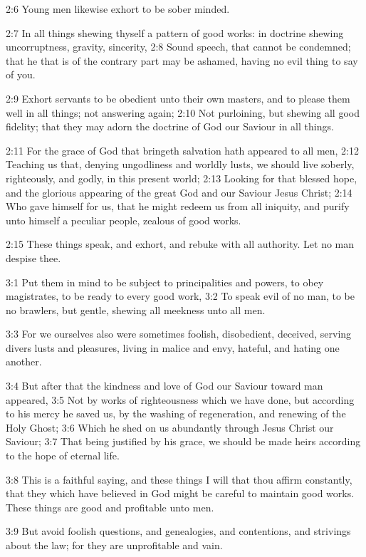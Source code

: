 2:6 Young men likewise exhort to be sober minded.

2:7 In all things shewing thyself a pattern of good works: in doctrine shewing uncorruptness, gravity, sincerity, 2:8 Sound speech, that cannot be condemned; that he that is of the contrary part may be ashamed, having no evil thing to say of you.

2:9 Exhort servants to be obedient unto their own masters, and to please them well in all things; not answering again; 2:10 Not purloining, but shewing all good fidelity; that they may adorn the doctrine of God our Saviour in all things.

2:11 For the grace of God that bringeth salvation hath appeared to all men, 2:12 Teaching us that, denying ungodliness and worldly lusts, we should live soberly, righteously, and godly, in this present world; 2:13 Looking for that blessed hope, and the glorious appearing of the great God and our Saviour Jesus Christ; 2:14 Who gave himself for us, that he might redeem us from all iniquity, and purify unto himself a peculiar people, zealous of good works.

2:15 These things speak, and exhort, and rebuke with all authority.  Let no man despise thee.

3:1 Put them in mind to be subject to principalities and powers, to obey magistrates, to be ready to every good work, 3:2 To speak evil of no man, to be no brawlers, but gentle, shewing all meekness unto all men.

3:3 For we ourselves also were sometimes foolish, disobedient, deceived, serving divers lusts and pleasures, living in malice and envy, hateful, and hating one another.

3:4 But after that the kindness and love of God our Saviour toward man appeared, 3:5 Not by works of righteousness which we have done, but according to his mercy he saved us, by the washing of regeneration, and renewing of the Holy Ghost; 3:6 Which he shed on us abundantly through Jesus Christ our Saviour; 3:7 That being justified by his grace, we should be made heirs according to the hope of eternal life.

3:8 This is a faithful saying, and these things I will that thou affirm constantly, that they which have believed in God might be careful to maintain good works. These things are good and profitable unto men.

3:9 But avoid foolish questions, and genealogies, and contentions, and strivings about the law; for they are unprofitable and vain.

